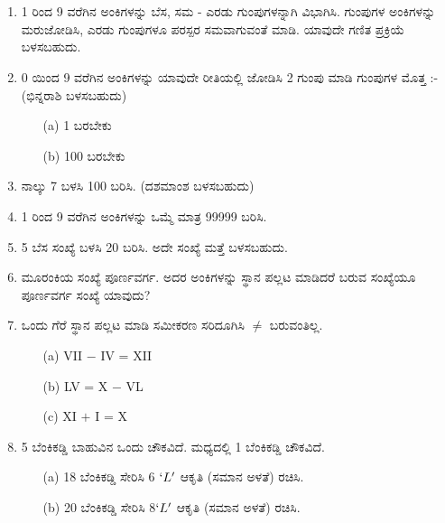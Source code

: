 \chapter[ಅಧ್ಯಾಯ 10]{}\label{chap10}

\begin{enumerate}
\renewcommand{\labelenumi}{\bf\theenumi.}
\itemsep=5pt

\item 1 ರಿಂದ 9 ವರೆಗಿನ ಅಂಕಿಗಳನ್ನು ಬೆಸ, ಸಮ - ಎರಡು ಗುಂಪುಗಳನ್ನಾಗಿ ವಿಭಾಗಿಸಿ. ಗುಂಪುಗಳ ಅಂಕಿಗಳನ್ನು ಮರುಜೋಡಿಸಿ, ಎರಡು ಗುಂಪುಗಳೂ ಪರಸ್ಪರ ಸಮವಾಗುವಂತೆ ಮಾಡಿ. ಯಾವುದೇ ಗಣಿತ ಪ್ರಕ್ರಿಯೆ ಬಳಸಬಹುದು. 

\item 0 ಯಿಂದ 9 ವರೆಗಿನ ಅಂಕಿಗಳನ್ನು ಯಾವುದೇ ರೀತಿಯಲ್ಲಿ ಜೋಡಿಸಿ 2 ಗುಂಪು ಮಾಡಿ ಗುಂಪುಗಳ ಮೊತ್ತ :- (ಭಿನ್ನರಾಶಿ ಬಳಸಬಹುದು)
\begin{itemize}
\item[(a)] 1 ಬರಬೇಕು 
\item[(b)] 100 ಬರಬೇಕು 
\end{itemize}

\item ನಾಲ್ಕು 7 ಬಳಸಿ 100 ಬರಿಸಿ. (ದಶಮಾಂಶ ಬಳಸಬಹುದು)

\item 1 ರಿಂದ 9 ವರೆಗಿನ ಅಂಕಿಗಳನ್ನು ಒಮ್ಮೆ ಮಾತ್ರ 99999 ಬರಿಸಿ. 

\item 5 ಬೆಸ ಸಂಖ್ಯೆ ಬಳಸಿ 20 ಬರಿಸಿ. ಅದೇ ಸಂಖ್ಯೆ ಮತ್ತೆ ಬಳಸಬಹುದು. 

\item ಮೂರಂಕಿಯ ಸಂಖ್ಯೆ ಪೂರ್ಣವರ್ಗ. ಅದರ ಅಂಕಿಗಳನ್ನು ಸ್ಥಾನ ಪಲ್ಲಟ ಮಾಡಿದರೆ ಬರುವ ಸಂಖ್ಯೆಯೂ ಪೂರ್ಣವರ್ಗ ಸಂಖ್ಯೆ ಯಾವುದು? 

\item ಒಂದು ಗೆರೆ ಸ್ಥಾನ ಪಲ್ಲಟ ಮಾಡಿ ಸಮೀಕರಣ ಸರಿದೂಗಿಸಿ $\neq$ ಬರುವಂತಿಲ್ಲ. 
\begin{itemize}
\item[(a)] VII $-$ IV = XII
\item[(b)] LV = X $-$ VL
\item[(c)] XI $+$ I = X
\end{itemize}

\item 5 ಬೆಂಕಿಕಡ್ಡಿ ಬಾಹುವಿನ ಒಂದು ಚೌಕವಿದೆ. ಮಧ್ಯದಲ್ಲಿ 1 ಬೆಂಕಿಕಡ್ಡಿ  ಚೌಕವಿದೆ. 
\begin{itemize}
\item[(a)] 18 ಬೆಂಕಿಕಡ್ಡಿ ಸೇರಿಸಿ 6 $`L'$ ಆಕೃತಿ (ಸಮಾನ ಅಳತೆ) ರಚಿಸಿ. 
\item[(b)] 20 ಬೆಂಕಿಕಡ್ಡಿ ಸೇರಿಸಿ 8$`L'$ ಆಕೃತಿ (ಸಮಾನ ಅಳತೆ) ರಚಿಸಿ. 
\end{itemize}


\end{enumerate}
